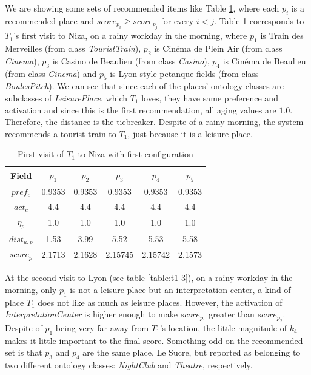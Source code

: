 We are showing some sets of recommended items like Table \ref{table:t1-1}, where each $p_i$ is a recommended place and $score_{p_i} \ge score_{p_j}$ for every $i < j$. Table \ref{table:t1-1} corresponds to $T_1$'s first visit to Niza, on a rainy workday in the morning, where $p_1$ is Train des Merveilles (from class \textit{TouristTrain}), $p_2$ is Cinéma de Plein Air (from class \textit{Cinema}), $p_3$ is Casino de Beaulieu (from class \textit{Casino}), $p_4$ is Cinéma de Beaulieu (from class \textit{Cinema}) and $p_5$ is Lyon-style petanque fields (from class \textit{BoulesPitch}). We can see that since each of the places' ontology classes are subclasses of \textit{LeisurePlace}, which $T_1$ loves, they have same preference and activation and since this is the first recommendation, all aging values are $1.0$. Therefore, the distance is the tiebreaker. Despite of a rainy morning, the system recommends a tourist train to $T_1$, just because it is a leisure place.
\begin{table}[h!]
    \centering
    \begin{tabular}{ |c|c|c|c|c|c| } 
        \hline
        Field   & $p_1$ & $p_2$ & $p_3$ & $p_4$ & $p_5$ \\
        \hline
        $pref_c$    &  0.9353 & 0.9353 & 0.9353 & 0.9353 & 0.9353 \\
        $act_c$     & 4.4 & 4.4 & 4.4 & 4.4 & 4.4 \\
        $\eta_p$    & 1.0 & 1.0 & 1.0 & 1.0 & 1.0 \\
        $dist_{u,p}$ & 1.53 & 3.99 & 5.52 & 5.53 & 5.58 \\
        $score_p$    & 2.1713 & 2.1628 & 2.15745 & 2.15742 & 2.1573 \\
        
        \hline
    \end{tabular}
    \caption{First visit of $T_1$ to Niza with first configuration}
    \label{table:t1-1}
\end{table}


At the second visit to Lyon (see table \ref{table:t1-3}), on a rainy workday in the morning, only $p_1$ is not a leisure place but an interpretation center, a kind of place $T_1$ does not like as much as leisure places. However, the activation of \textit{InterpretationCenter} is higher enough to make $score_{p_1}$ greater than $score_{p_2}$. Despite of $p_1$ being very far away from $T_1$'s location, the little magnitude of $k_4$ makes it little important to the final score. Something odd on the recommended set is that $p_3$ and $p_4$ are the same place, Le Sucre, but reported as belonging to two different ontology classes: \textit{NightClub} and \textit{Theatre}, respectively.


